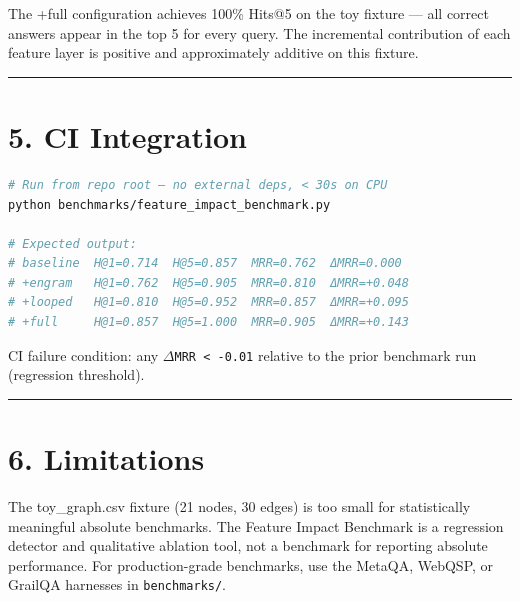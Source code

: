 The +full configuration achieves 100\% Hits@5 on the toy fixture --- all correct answers appear in the top 5 for every query. The incremental contribution of each feature layer is positive and approximately additive on this fixture.

\medskip\noindent\rule{\linewidth}{0.4pt}\medskip

\section*{5. CI Integration}

\begin{lstlisting}[language=Bash]
# Run from repo root — no external deps, < 30s on CPU
python benchmarks/feature_impact_benchmark.py

# Expected output:
# baseline  H@1=0.714  H@5=0.857  MRR=0.762  ΔMRR=0.000
# +engram   H@1=0.762  H@5=0.905  MRR=0.810  ΔMRR=+0.048
# +looped   H@1=0.810  H@5=0.952  MRR=0.857  ΔMRR=+0.095
# +full     H@1=0.857  H@5=1.000  MRR=0.905  ΔMRR=+0.143
\end{lstlisting}

CI failure condition: any \texttt{$\Delta$MRR < -0.01} relative to the prior benchmark run (regression threshold).

\medskip\noindent\rule{\linewidth}{0.4pt}\medskip

\section*{6. Limitations}

The toy_graph.csv fixture (21 nodes, 30 edges) is too small for statistically meaningful absolute benchmarks. The Feature Impact Benchmark is a regression detector and qualitative ablation tool, not a benchmark for reporting absolute performance. For production-grade benchmarks, use the MetaQA, WebQSP, or GrailQA harnesses in \texttt{benchmarks/}.